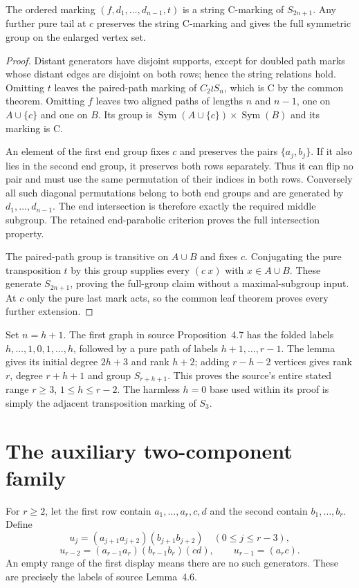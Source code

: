 \documentclass[a4paper,11pt]{article}
\newcommand{\Sym}{\operatorname{Sym}}\newcommand{\gen}[1]{\langle #1\rangle}
\begin{document}
\begin{lemma}\label{lem:folded-tail}
The ordered marking $(f,d_1,\ldots,d_{n-1},t)$ is a string C-marking of
$S_{2n+1}$. Any further pure tail at $c$ preserves the string C-marking and
gives the full symmetric group on the enlarged vertex set.
\end{lemma}
\begin{proof}
Distant generators have disjoint supports, except for doubled path marks
whose distant edges are disjoint on both rows; hence the string relations
hold. Omitting $t$ leaves the paired-path marking of $C_2\wr S_n$, which
is C by the common theorem. Omitting $f$ leaves two aligned paths of lengths
$n$ and $n-1$, one on $A\cup\{c\}$ and one on $B$. Its group is
$\Sym(A\cup\{c\})\times\Sym(B)$ and its marking is C.

An element of the first end group fixes $c$ and preserves the pairs
$\{a_j,b_j\}$. If it also lies in the second end group, it preserves both
rows separately. Thus it can flip no pair and must use the same permutation
of their indices in both rows. Conversely all such diagonal permutations
belong to both end groups and are generated by $d_1,\ldots,d_{n-1}$.
The end intersection is therefore exactly the required middle subgroup.
The retained end-parabolic criterion proves the full intersection property.

The paired-path group is transitive on $A\cup B$ and fixes $c$.
Conjugating the pure transposition $t$ by this group supplies every
$(c\ x)$ with $x\in A\cup B$. These generate $S_{2n+1}$, proving the
full-group claim without a maximal-subgroup input. At $c$ only the pure
last mark acts, so the common leaf theorem proves every further extension.
\end{proof}

Set $n=h+1$. The first graph in source Proposition~4.7 has the folded labels
$h,\ldots,1,0,1,\ldots,h$, followed by a pure path of labels
$h+1,\ldots,r-1$. The lemma gives its initial degree $2h+3$ and rank $h+2$;
adding $r-h-2$ vertices gives rank $r$, degree $r+h+1$ and group $S_{r+h+1}$.
This proves the source's entire stated range $r\geq3$, $1\leq h\leq r-2$.
The harmless $h=0$ base used within its proof is simply the adjacent
transposition marking of $S_3$.

\section{The auxiliary two-component family}
For $r\geq2$, let the first row contain
$a_1,\ldots,a_r,c,d$ and the second contain $b_1,\ldots,b_r$.
Define
\[
 u_j=(a_{j+1}a_{j+2})(b_{j+1}b_{j+2})\quad(0\leq j\leq r-3),
\]
\[
 u_{r-2}=(a_{r-1}a_r)(b_{r-1}b_r)(cd),\qquad
 u_{r-1}=(a_rc).
\]
An empty range of the first display means there are no such generators.
These are precisely the labels of source Lemma~4.6.
\end{document}
